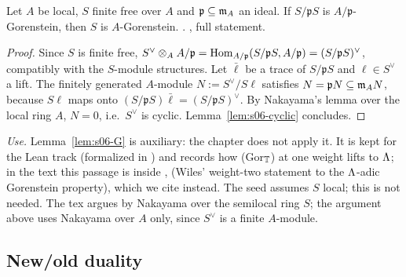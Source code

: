 \begin{lemma}\label{lem:s06-G}
Let $A$ be local, $S$ finite free over $A$ and $\mathfrak p\subseteq\mathfrak{m}_A$ an ideal. If $S/\mathfrak pS$ is $A/\mathfrak p$-Gorenstein, then
$S$ is $A$-Gorenstein. \stproved{} . \stformalized{}, full statement.
\end{lemma}
\begin{proof}
Since $S$ is finite free, $S^\vee\otimes_AA/\mathfrak p=\operatorname{Hom}_{A/\mathfrak p}(S/\mathfrak pS,A/\mathfrak p)=(S/\mathfrak pS)^\vee$, compatibly with the
$S$-module structures. Let $\bar\ell$ be a trace of $S/\mathfrak pS$ and $\ell\in S^\vee$ a lift. The finitely generated $A$-module
$N:=S^\vee/S\ell$ satisfies $N=\mathfrak pN\subseteq\mathfrak{m}_AN$, because $S\ell$ maps onto $(S/\mathfrak pS)\bar\ell=(S/\mathfrak pS)^\vee$. By
Nakayama's lemma over the local ring $A$, $N=0$, i.e.\ $S^\vee$ is cyclic. Lemma~\ref{lem:s06-cyclic} concludes.
\end{proof}
\noindent \emph{Use.} Lemma~\ref{lem:s06-G} is auxiliary: the chapter does not apply it. It is kept for the Lean track (formalized in ) and records how (Gor$_{\mathbb{T}}$) at one weight lifts to $\Lambda$; in the text this passage is inside \cite{Hs}, \cite{MW86} (Wiles' weight-two statement to the $\Lambda$-adic Gorenstein property), which we cite instead.
\noindent The seed assumes $S$ local; this is not needed. The tex argues by Nakayama over the semilocal ring $S$; the argument above uses
Nakayama over $A$ only, since $S^\vee$ is a finite $A$-module.

\subsection{New/old duality}

